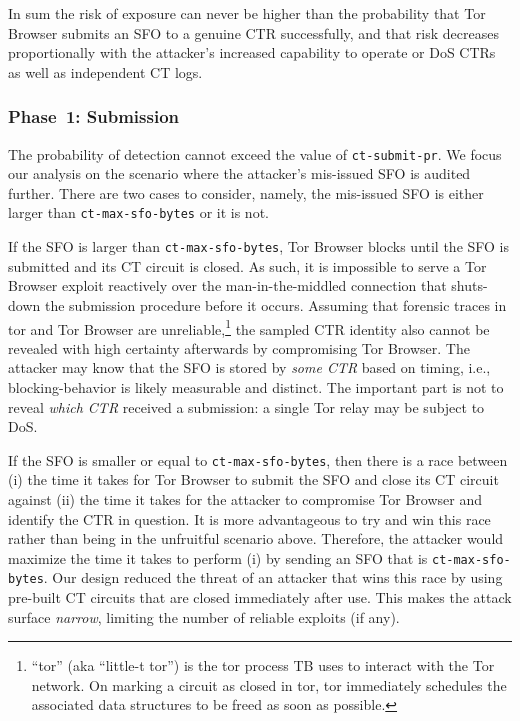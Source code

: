 In sum the risk of exposure can never be higher than the probability that Tor
Browser submits an SFO to a genuine CTR successfully, and that risk decreases
proportionally with the attacker's increased capability to operate or DoS CTRs
as well as independent CT logs.

\subsubsection{Phase~1: Submission} \label{sec:analysis:pr:phase1}
The probability of detection cannot exceed the value of \texttt{ct-submit-pr}.
We focus our analysis on the scenario where the
attacker's mis-issued SFO is audited further.  There are two cases to consider,
namely, the mis-issued SFO is either larger than \texttt{ct-max-sfo-bytes} or it
is not.

If the SFO is larger than \texttt{ct-max-sfo-bytes}, Tor Browser blocks until
the SFO is submitted and its CT circuit is closed.  As such, it is impossible to
serve a Tor Browser exploit reactively over the man-in-the-middled connection
that shuts-down the submission procedure before it occurs.  Assuming that
forensic traces in tor and Tor Browser are unreliable,\footnote{%
	``tor'' (aka ``little-t tor'') is the tor process TB uses to interact
        with the Tor network.
        On marking a circuit as closed in tor, tor immediately schedules the
	associated data structures to be freed as soon as possible.
} the sampled CTR identity also cannot be revealed with high certainty
afterwards by compromising Tor Browser.  The attacker may know that the SFO is
stored by \emph{some CTR} based on timing, i.e., blocking-behavior is likely
measurable and distinct.  The important part is not to reveal \emph{which CTR}
received a submission:  a single Tor relay may be subject to DoS.

If the SFO is smaller or equal to \texttt{ct-max-sfo-bytes}, then there is a
race between (i) the time it takes for Tor Browser to submit the SFO and close
its CT circuit against (ii) the time it takes for the attacker to compromise Tor
Browser and identify the CTR in question.  It is more advantageous to try and
win this race rather than being in the unfruitful scenario above.  Therefore,
the attacker would maximize the time it takes to perform (i) by sending an SFO
that is \texttt{ct-max-sfo-bytes}.  Our design reduced the threat of an attacker
that wins this race by using pre-built CT circuits that are closed immediately
after use.  This makes the attack surface \emph{narrow}, limiting the number of
reliable exploits (if any).

